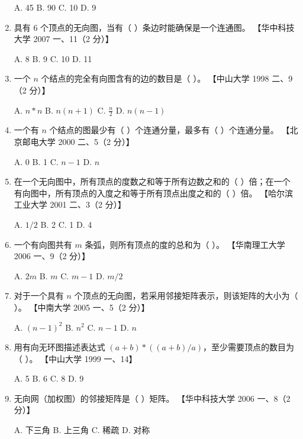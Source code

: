 \documentclass[lang=cn,newtx,10pt,scheme=chinese]{elegantbook}
\begin{document}
\begin{enumerate}
        A. 45 \quad B. 90 \quad C. 10 \quad D. 9  
    
        \item 具有 6 个顶点的无向图，当有（ ）条边时能确保是一个连通图。  
        【华中科技大学 2007 一、11（2 分）】  

        A. 8 \quad B. 9 \quad C. 10 \quad D. 11  
    
        \item 一个 $n$ 个结点的完全有向图含有的边的数目是（ ）。  
        【中山大学 1998 二、9（2 分）】 

        A. $n*n$ \quad B. $n(n+1)$ \quad C. $\frac{n}{2}$ \quad D. $n(n-1)$  
    
        \item 一个有 $n$ 个结点的图最少有（ ）个连通分量，最多有（ ）个连通分量。  
        【北京邮电大学 2000 二、5（2 分）】  

        A. 0 \quad B. 1 \quad C. $n-1$ \quad D. $n$  
    
        \item 在一个无向图中，所有顶点的度数之和等于所有边数之和的（ ）倍；在一个有向图中，所有顶点的入度之和等于所有顶点出度之和的（ ）倍。  
        【哈尔滨工业大学 2001 二、3（2 分）】 

        A. $1/2$ \quad B. 2 \quad C. 1 \quad D. 4  
    
        \item 一个有向图共有 $m$ 条弧，则所有顶点的度的总和为（ ）。  
        【华南理工大学 2006 一、9（2 分）】  

        A. $2m$ \quad B. $m$ \quad C. $m-1$ \quad D. $m/2$  
    
        \item 对于一个具有 $n$ 个顶点的无向图，若采用邻接矩阵表示，则该矩阵的大小为（ ）。  
        【中南大学 2005 一、5（2 分）】  

        A. $(n-1)^2$ \quad B. $n^2$ \quad C. $n-1$ \quad D. $n$  
    
        \item 用有向无环图描述表达式 $(a+b) \ast ((a+b)/a)$，至少需要顶点的数目为（ ）。  
        【中山大学 1999 一、14】  

        A. 5 \quad B. 6 \quad C. 8 \quad D. 9  
    
        \item 无向网（加权图）的邻接矩阵是（ ）矩阵。  
        【华中科技大学 2006 一、8（2 分）】  

        A. 下三角 \quad B. 上三角 \quad C. 稀疏 \quad D. 对称  
    

\end{enumerate}
\end{document}
